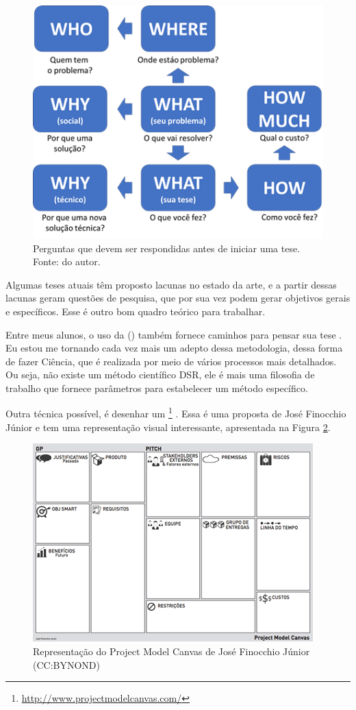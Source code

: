 \begin{figure}[hbt]
    \centering
    \includegraphics[width=0.7\linewidth]{Images/5w2h}
    \caption{Perguntas que devem ser respondidas antes de iniciar uma tese. Fonte: do autor.}
    \label{fig:5w2h}
\end{figure}




Algumas teses atuais têm proposto lacunas no estado da arte, e a partir dessas lacunas geram questões de pesquisa, que por sua vez podem gerar objetivos gerais e específicos. Esse é outro bom quadro teórico para trabalhar.

Entre meus alunos, o uso da  ()\citep{Pimentel2020} também fornece caminhos para pensar sua tese . Eu estou me tornando cada vez mais um adepto dessa metodologia, dessa forma de fazer Ciência, que é realizada por meio de vários processos mais detalhados. Ou seja, não existe um método científico DSR, ele é mais uma filosofia de trabalho que fornece parâmetros para estabelecer um método específico.

Outra técnica possível, é desenhar um \footnote{\url{http://www.projectmodelcanvas.com/}} . Essa é uma proposta de José Finocchio Júnior e tem uma representação visual interessante, apresentada na Figura \ref{fig:pmc}.

\begin{figure}
    \centering
    \includegraphics[width=0.7\linewidth]{Images/PMC}
    \caption{Representação do Project Model Canvas de José Finocchio Júnior (CC:BYNOND)}
    \label{fig:pmc}
\end{figure}


